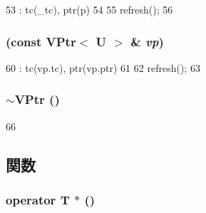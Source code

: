 \begin{DoxyCode}
53         : tc(_tc), ptr(p)
54     {
55         refresh();
56     }
\end{DoxyCode}
\hypertarget{classVPtr_a4f0a913709c195b41591d6d624435663}{
\subsubsection[{VPtr}]{ (const {\bf VPtr}$<$ U $>$ \& {\em vp})}}
\label{classVPtr_a4f0a913709c195b41591d6d624435663}



\begin{DoxyCode}
60         : tc(vp.tc), ptr(vp.ptr)
61     {
62         refresh();
63     }
\end{DoxyCode}
\hypertarget{classVPtr_a01c82e4197153328212e92ba561e5a4a}{
\subsubsection[{$\sim$VPtr}]{\setlength{\rightskip}{0pt plus 5cm}$\sim${\bf VPtr} ()}}
\label{classVPtr_a01c82e4197153328212e92ba561e5a4a}



\begin{DoxyCode}
66     {}
\end{DoxyCode}


\subsection{関数}
\hypertarget{classVPtr_a4e20322854ce5d78776cdaf1a87aacd9}{
\subsubsection[{operator T $\ast$}]{\setlength{\rightskip}{0pt plus 5cm}operator T $\ast$ ()}}
\label{classVPtr_a4e20322854ce5d78776cdaf1a87aacd9}



